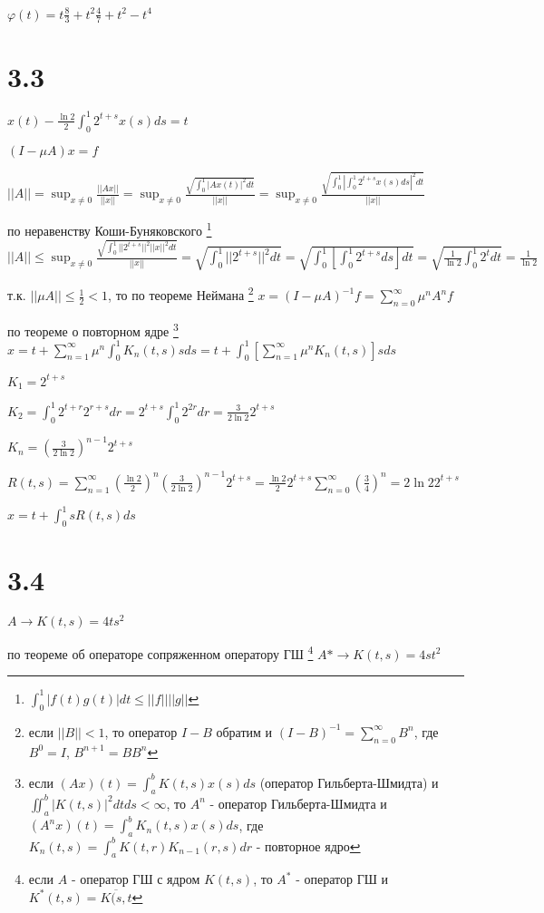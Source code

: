 \documentclass[russian]{article}
\begin{document}
$\varphi(t) = t \frac{8}{3} + t^2 \frac{4}{7} + t^2 - t^4$

\section*{3.3}

$x(t) - \frac{\ln 2}{2}\int_0^1 2^{t+s} x(s) ds = t$

$(I-\mu A)x = f$

$||A||=\sup_{x \ne 0} \frac{||Ax||}{||x||} = \sup_{x \ne 0} \frac{\sqrt{\int_0^1 |Ax(t)|^2 dt}}{||x||}=\sup_{x \ne 0} \frac{\sqrt{\int_0^1 |\int_0^1 2^{t+s}x(s)ds|^2 dt}}{||x||}$ 

по неравенству Коши-Буняковского \footnote{
	$\int_0^1|f(t) g(t)| dt \le ||f|| ||g|| $
}
$||A|| \le \sup_{x \ne 0} \frac{\sqrt{\int_0^1 ||2^{t+s}||^2 ||x||^2 dt}}{||x||} = \sqrt{\int_0^1 ||2^{t+s}||^2 dt} = \sqrt{\int_0^1 [\int_0^1 2^{t+s} ds]dt} =\sqrt{\frac{1}{\ln 2} \int_0^1 2^t dt} = \frac{1}{\ln 2}$

т.к. $||\mu A|| \le \frac{1}{2} < 1$, то по теореме Неймана \footnote{
	если $||B|| < 1$, то оператор $I-B$ обратим и $(I-B)^{-1} = \sum _{n=0}^\infty B^n$, где $B^0 = I$, $B^{n+1} = B B^n$
}
$x=(I-\mu A)^{-1}f=\sum_{n=0}^{\infty}\mu^n A^n f$

по теореме о повторном ядре \footnote{
	если $(Ax)(t)=\int_a^bK(t,s)x(s)ds$ (оператор Гильберта-Шмидта)
	и $\iint_{a}^{b}|K(t,s)|^2 dt ds < \infty$, то $A^n$ - оператор Гильберта-Шмидта 
	и $(A^n x)(t) = \int_a^b K_n(t,s)x(s) ds$, где $K_n(t,s) = \int_a^b K(t,r) K_{n-1}(r,s)dr$ - повторное ядро
} $x=t + \sum_{n=1}^{\infty}\mu^n \int_0^1 K_n(t,s)s ds=t+\int_0^1[\sum_{n=1}^\infty \mu ^n K_n(t,s)]s ds$

$K_1 = 2^{t+s}$

$K_2 = \int_0^1 2^{t+r} 2^{r+s} dr = 2^{t+s} \int_0^1 2^{2r} dr = \frac{3}{2 \ln 2} 2^{t+s}$

$K_n = (\frac{3}{2 \ln 2})^{n-1} 2^{t+s} $

$R(t,s) = \sum_{n=1}^\infty (\frac{\ln 2}{2})^n (\frac{3}{2 \ln 2})^{n-1} 2^{t+s} = \frac{\ln 2}{2} 2^{t+s} \sum_{n=0}^\infty (\frac{3}{4})^n = 2 \ln 2 2^{t+s}$

$x=t+\int_0^1 s R(t,s) ds$

\section*{3.4}

$A \to K(t,s)=4 t s^2$

по теореме об операторе сопряженном оператору ГШ \footnote{
	если $A$ - оператор ГШ с ядром $K(t,s)$, то $A^*$ - оператор ГШ и $K^*(t,s)=\overline{K(s,t}$
}
$A* \to K(t,s)=4 s t^2$
\end{document}
